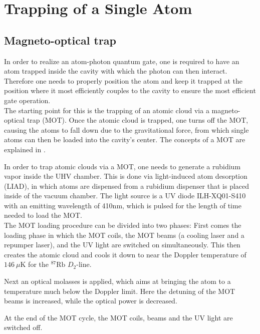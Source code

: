 \section{Trapping of a Single Atom}

\subsection{Magneto-optical trap}

In order to realize an atom-photon quantum gate, one is required to have an atom trapped inside the cavity with which the photon can then interact. Therefore one needs to properly position the atom and keep it trapped at the position where it most efficiently couples to the cavity to ensure the most efficient gate operation.  \\

The starting point for this is the trapping of an atomic cloud via a magneto-optical trap (MOT). Once the atomic cloud is trapped, one turns off the MOT, causing the atoms to fall down due to the gravitational force, from which single atoms can then be loaded into the cavity's center. The concepts of a MOT are explained in \cite{AtomicPhysicsJFoot2004}.

In order to trap atomic clouds via a MOT, one needs to generate a rubidium vapor inside the UHV chamber. This is done via light-induced atom desorption (LIAD), in which atoms are dispensed from a rubidium dispenser that is placed inside of the vacuum chamber. The light source is a UV diode ILH-XQ01-S410 with an emitting wavelength of 410nm, which is pulsed for the length of time needed to load the MOT. \\

The MOT loading procedure can be divided into two phases:
First comes the loading phase in which the MOT coils, the MOT beams (a cooling laser and a repumper laser), and the UV light are switched on simultaneously. This then creates the atomic cloud and cools it down to near the Doppler temperature of $\SI{146}{\mu\kelvin}$ for the $^{87}\text{Rb}$ $D_2\text{-line}$. \cite{SteckRb87}

Next an optical molasses is applied, which aims at bringing the atom to a temperature much below the Doppler limit. Here the detuning of the MOT beams is increased, while the optical power is decreased.

At the end of the MOT cycle, the MOT coils, beams and the UV light are switched off.

